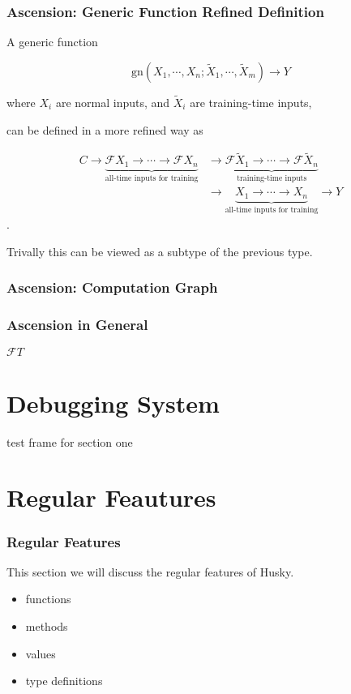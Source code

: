\documentclass{beamer}   	%
\theoremstyle{definition}
\begin{document}
\begin{frame}
\frametitle{Ascension: Generic Function Refined Definition}

A generic function

$$\text{gn}(X_1,\cdots,X_n;\tilde X_1,\cdots,\tilde X_m) \to Y$$

where $X_i$ are normal inputs, and $\tilde X_i$ are training-time inputs,

can be defined in a more refined way as

\begin{equation}
	\begin{split}
	 C\to \underbrace{\mathscr{F}X_1\to \cdots \to\mathscr{F}X_n}_{\text{all-time inputs for training}}
	 &\to \underbrace{\mathscr{F}\tilde X_1\to \cdots \to\mathscr{F}\tilde X_n}_{\text{training-time inputs}}\\
	 &\to \underbrace{X_1 \to \cdots \to X_n}_{\text{all-time inputs for training}} \to Y
	\end{split}
\end{equation}.

Trivally this can be viewed as a subtype of the previous type.
\end{frame}

\begin{frame}
\frametitle{Ascension: Computation Graph}

\end{frame}

\begin{frame}
\frametitle{Ascension in General}

$\mathscr{F}T$
\end{frame}

\section{Debugging System}
\begin{frame}
test frame for section one
\end{frame}

\section{Regular Feautures}
\begin{frame}
\frametitle{Regular Features}
This section we will discuss the regular features of Husky.

\begin{itemize}
	\item functions
	\item methods
	\item values
	\item type definitions
\end{itemize}
\end{frame}
\end{document}
